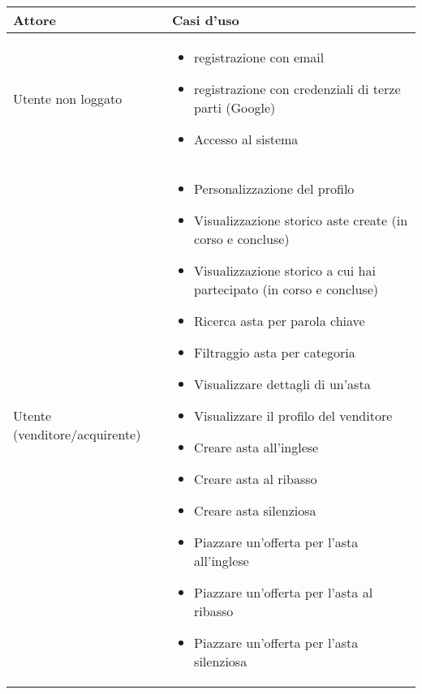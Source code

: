 {
	\setlength{\tabcolsep}{10pt} %
	\renewcommand{\arraystretch}{1.5} %

	\begin{tabular}{|l|p{330pt}|}
		\hline
		\textbf{Attore}               & \textbf{Casi d'uso}                                        \\ \hline
		Utente non loggato            & \begin{itemize}[leftmargin=15pt]
			                                \setlength{\itemsep}{0pt}  %
			                                \setlength{\parskip}{0pt}  %
			                                \item registrazione con email
			                                \item registrazione con credenziali di terze parti (Google)
			                                \item Accesso al sistema
		                                \end{itemize} \\ \hline
		Utente (venditore/acquirente) &
		\begin{itemize}[leftmargin=15pt]
			\setlength{\itemsep}{0pt}  %
			\setlength{\parskip}{0pt}  %
			\item Personalizzazione del profilo
			\item Visualizzazione storico aste create (in corso e concluse)
			\item Visualizzazione storico a cui hai partecipato (in corso e concluse)
			\item Ricerca asta per parola chiave
			\item Filtraggio asta per categoria
			\item Visualizzare dettagli di un'asta
			\item Visualizzare il profilo del venditore

		\end{itemize}\medskip
		\begin{itemize}[leftmargin=15pt]
			\setlength{\itemsep}{0pt}  %
			\setlength{\parskip}{0pt}  %
			\item Creare asta all'inglese
			\item Creare asta al ribasso
			\item Creare asta silenziosa
		\end{itemize}\medskip
		\begin{itemize}[leftmargin=15pt]
			\setlength{\itemsep}{0pt}  %
			\setlength{\parskip}{0pt}  %
			\item Piazzare un'offerta per l'asta all'inglese
			\item Piazzare un'offerta per l'asta al ribasso
			\item Piazzare un'offerta per l'asta silenziosa
		\end{itemize}                                \\ \hline
	\end{tabular}
}

